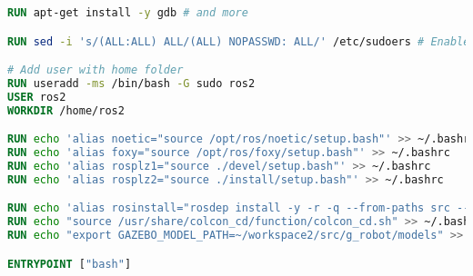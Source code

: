 \begin{lstlisting}[language=Dockerfile]
RUN apt-get install -y gdb # and more

RUN sed -i 's/(ALL:ALL) ALL/(ALL) NOPASSWD: ALL/' /etc/sudoers # Enable sudo without password

# Add user with home folder
RUN useradd -ms /bin/bash -G sudo ros2
USER ros2
WORKDIR /home/ros2

RUN echo 'alias noetic="source /opt/ros/noetic/setup.bash"' >> ~/.bashrc
RUN echo 'alias foxy="source /opt/ros/foxy/setup.bash"' >> ~/.bashrc
RUN echo 'alias rosplz1="source ./devel/setup.bash"' >> ~/.bashrc
RUN echo 'alias rosplz2="source ./install/setup.bash"' >> ~/.bashrc

RUN echo 'alias rosinstall="rosdep install -y -r -q --from-paths src --ignore-src --rosdistro foxy"' >> ~/.bashrc
RUN echo "source /usr/share/colcon_cd/function/colcon_cd.sh" >> ~/.bashrc
RUN echo "export GAZEBO_MODEL_PATH=~/workspace2/src/g_robot/models" >> ~/.bashrc

ENTRYPOINT ["bash"]
\end{lstlisting}


